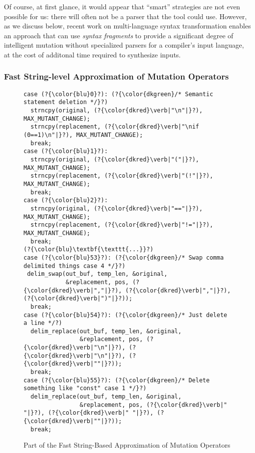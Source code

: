 Of course, at first
glance, it would appear that  ``smart'' strategies are not even
possible for us: there will often not be a parser that the
tool could use.  However, as we discuss below, recent work on
multi-language syntax transformation enables an approach that can use
\emph{syntax fragments} to provide a significant degree of intelligent
mutation without specialized parsers for a compiler's input language,
at the cost of additonal time required to synthesize inputs.

\subsubsection{Fast String-level Approximation of Mutation Operators}
\label{strat-fast-string-level}

\begin{figure}[h!]
\begin{lstlisting}[basicstyle=\scriptsize\ttfamily,numbers=none,xleftmargin=0.7em,xrightmargin=.7em]
case (?{\color{blu}0}?): (?{\color{dkgreen}/* Semantic statement deletion */}?)
  strncpy(original, (?{\color{dkred}\verb|"\n"|}?), MAX_MUTANT_CHANGE);
  strncpy(replacement, (?{\color{dkred}\verb|"\nif (0==1)\n"|}?), MAX_MUTANT_CHANGE);
  break;
case (?{\color{blu}1}?):
  strncpy(original, (?{\color{dkred}\verb|"("|}?), MAX_MUTANT_CHANGE);
  strncpy(replacement, (?{\color{dkred}\verb|"(!"|}?), MAX_MUTANT_CHANGE);
  break;
case (?{\color{blu}2}?):
  strncpy(original, (?{\color{dkred}\verb|"=="|}?), MAX_MUTANT_CHANGE);
  strncpy(replacement, (?{\color{dkred}\verb|"!="|}?), MAX_MUTANT_CHANGE);
  break;
(?{\color{blu}\textbf{\texttt{...}}?)
case (?{\color{blu}53}?): (?{\color{dkgreen}/* Swap comma delimited things case 4 */}?)
 delim_swap(out_buf, temp_len, &original, 
            &replacement, pos, (?{\color{dkred}\verb|","|}?), (?{\color{dkred}\verb|","|}?), (?{\color{dkred}\verb|")"|}?));
  break;
case (?{\color{blu}54}?): (?{\color{dkgreen}/* Just delete a line */?)
  delim_replace(out_buf, temp_len, &original, 
                &replacement, pos, (?{\color{dkred}\verb|"\n"|}?), (?{\color{dkred}\verb|"\n"|}?), (?{\color{dkred}\verb|""|}?));
  break;
case (?{\color{blu}55}?): (?{\color{dkgreen}/* Delete something like "const" case 1 */}?)
  delim_replace(out_buf, temp_len, &original, 
                &replacement, pos, (?{\color{dkred}\verb|" "|}?), (?{\color{dkred}\verb|" "|}?), (?{\color{dkred}\verb|""|}?));
  break;    
\end{lstlisting}
\caption{Part of the Fast String-Based Approximation of Mutation Operators}
\label{fig:foperators}
\end{figure}

